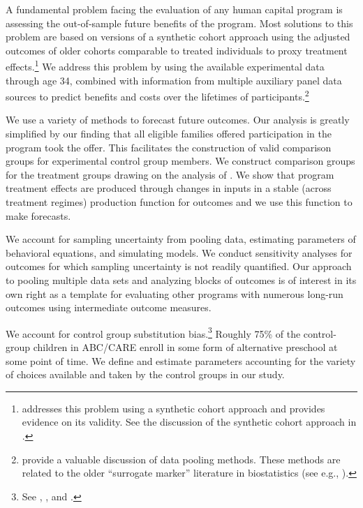 A fundamental problem facing the evaluation of any human capital program is assessing the out-of-sample future benefits of the program. Most solutions to this problem are based on versions of a synthetic cohort approach using the adjusted outcomes of older cohorts comparable to treated individuals to proxy treatment effects.\footnote{\cite{Mincer_1974_schooling} addresses this problem using a synthetic cohort approach and provides evidence on its validity. See the discussion of the synthetic cohort approach in \cite{Heckman_Lochner_ea_2006_HEE}.} We address this problem by using the available experimental data through age 34, combined with information from multiple auxiliary panel data sources to predict benefits and costs over the lifetimes of participants.\footnote{\citet{Ridder_Moffitt_2007_hbk_metricsdata} provide a valuable discussion of data pooling methods. These methods are related to the older ``surrogate marker'' literature in biostatistics (see e.g., \citealp{Prentice_1989_Surrogate_SiM}).}

We use a variety of methods to forecast future outcomes. Our analysis is greatly simplified by our finding that all eligible families offered participation in the program took the offer. This facilitates the construction of valid comparison groups for experimental control group members. We construct comparison groups for the treatment groups drawing on the analysis of \citet{Heckman_Ichimura_etal_1998_REStud}. We show that program treatment effects are produced through changes in inputs in a stable (across treatment regimes) production function for outcomes and we use this function to make forecasts.

We account for sampling uncertainty from pooling data, estimating parameters of behavioral equations, and simulating models. We conduct sensitivity analyses for outcomes for which sampling uncertainty is not readily quantified. Our approach to pooling multiple data sets and analyzing blocks of outcomes is of interest in its own right as a template for evaluating other programs with numerous long-run outcomes using intermediate outcome measures.

We account for control group substitution bias.\footnote{See \cite{Heckman_1992_randomization}, \cite{Heckman_Hohmann_etal_2000_QJE}, and \cite{Kline_Walters_2016_QJE}.} Roughly 75\% of the control-group children in ABC/CARE enroll in some form of alternative preschool at some point of time. We define and estimate parameters accounting for the variety of choices available and taken by the control groups in our study.

